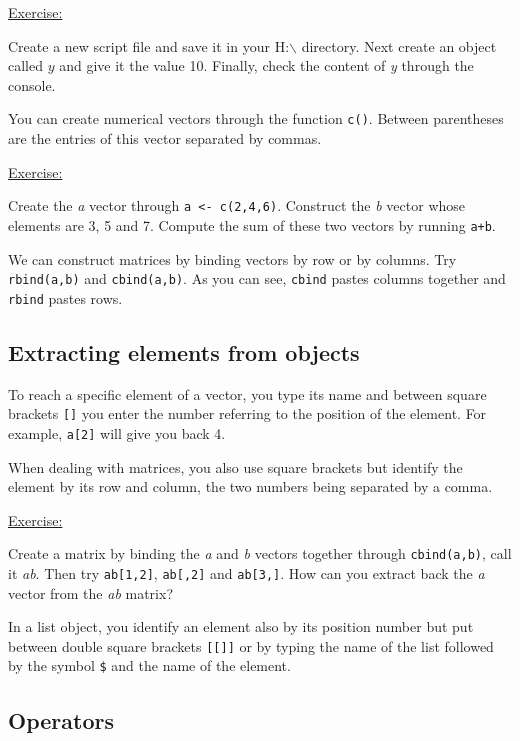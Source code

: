 \documentclass[a4paper,12pt]{article}\usepackage[]{graphicx}\usepackage[]{color}
\newenvironment{exo}
{\begin{center}\setlength{\textwidth}{140mm} \underline{Exercise:} \begin{minipage}[t]{120mm}}
{\end{minipage}\setlength{\textwidth}{160mm}\end{center}}
\begin{document}
\begin{exo}
Create a new script file and save it in your H:$\backslash$ directory. Next create an object called \emph{$y$} and give it the value 10. Finally, check the content of \emph{y} through the console.
\end{exo}

You can create numerical vectors through the function \texttt{c()}. Between parentheses are the entries of this vector separated by commas.

\begin{exo}
Create the \emph{a} vector through \texttt{a <- c(2,4,6)}. Construct the \emph{b} vector whose elements are 3, 5 and 7. Compute the sum of these two vectors by running \texttt{a+b}.
\end{exo}

We can construct matrices by binding vectors by row or by columns. Try \verb"rbind(a,b)" and \verb"cbind(a,b)". As you can see, \verb"cbind" pastes columns
together and \verb"rbind" pastes rows.

\subsection{Extracting elements from objects}

To reach a specific element of a vector, you type its name and between square brackets \texttt{[]} you enter the number referring to the position of the element. For example, \texttt{a[2]} will give you back 4.

When dealing with matrices, you also use square brackets but identify the element by its row and column, the two numbers being separated by a comma.

\begin{exo}
Create a matrix by binding the \emph{a} and \emph{b} vectors together through \texttt{cbind(a,b)}, call it \emph{ab}. Then try \texttt{ab[1,2]}, \texttt{ab[,2]} and \texttt{ab[3,]}. How can you extract back the \emph{a} vector from the \emph{ab} matrix?
\end{exo}

In a list object, you identify an element also by its position number but put between double square brackets \texttt{[[]]} or by typing the name of the list followed
by the symbol \verb"$" and the name of the element.

\subsection{Operators} \label{operators}
\end{document}
